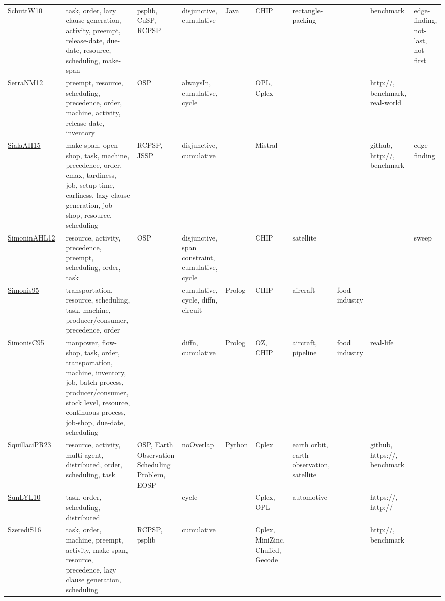 {\begin{longtable}{p{3cm}p{4cm}p{2cm}p{2cm}p{2cm}p{2cm}p{2cm}p{2cm}p{2cm}p{2cm}}
\href{papers/SchuttW10.pdf}{SchuttW10}~\cite{SchuttW10} & task, order, lazy clause generation, activity, preempt, release-date, due-date, resource, scheduling, make-span & psplib, CuSP, RCPSP & disjunctive, cumulative & Java & CHIP & rectangle-packing &  & benchmark & edge-finding, not-last, not-first\\
\href{papers/SerraNM12.pdf}{SerraNM12}~\cite{SerraNM12} & preempt, resource, scheduling, precedence, order, machine, activity, release-date, inventory & OSP & alwaysIn, cumulative, cycle &  & OPL, Cplex &  &  & http://, benchmark, real-world & \\
\href{papers/SialaAH15.pdf}{SialaAH15}~\cite{SialaAH15} & make-span, open-shop, task, machine, precedence, order, cmax, tardiness, job, setup-time, earliness, lazy clause generation, job-shop, resource, scheduling & RCPSP, JSSP & disjunctive, cumulative &  & Mistral &  &  & github, http://, benchmark & edge-finding\\
\href{papers/SimoninAHL12.pdf}{SimoninAHL12}~\cite{SimoninAHL12} & resource, activity, precedence, preempt, scheduling, order, task & OSP & disjunctive, span constraint, cumulative, cycle &  & CHIP & satellite &  &  & sweep\\
\href{papers/Simonis95.pdf}{Simonis95}~\cite{Simonis95} & transportation, resource, scheduling, task, machine, producer/consumer, precedence, order &  & cumulative, cycle, diffn, circuit & Prolog & CHIP & aircraft & food industry &  & \\
\href{papers/SimonisC95.pdf}{SimonisC95}~\cite{SimonisC95} & manpower, flow-shop, task, order, transportation, machine, inventory, job, batch process, producer/consumer, stock level, resource, continuous-process, job-shop, due-date, scheduling &  & diffn, cumulative & Prolog & OZ, CHIP & aircraft, pipeline & food industry & real-life & \\
\href{papers/SquillaciPR23.pdf}{SquillaciPR23}~\cite{SquillaciPR23} & resource, activity, multi-agent, distributed, order, scheduling, task & OSP, Earth Observation Scheduling Problem, EOSP & noOverlap & Python & Cplex & earth orbit, earth observation, satellite &  & github, https://, benchmark & \\
\href{papers/SunLYL10.pdf}{SunLYL10}~\cite{SunLYL10} & task, order, scheduling, distributed &  & cycle &  & Cplex, OPL & automotive &  & https://, http:// & \\
\href{papers/SzerediS16.pdf}{SzerediS16}~\cite{SzerediS16} & task, order, machine, preempt, activity, make-span, resource, precedence, lazy clause generation, scheduling & RCPSP, psplib & cumulative &  & Cplex, MiniZinc, Chuffed, Gecode &  &  & http://, benchmark & \\

\end{longtable}}
